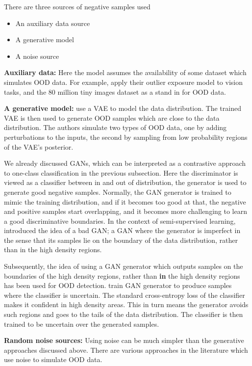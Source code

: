 \documentclass[../main.tex]{subfiles}
\begin{document}
There are three sources of negative samples used
\begin{itemize}
    \item An auxiliary data source
    \item A generative model
    \item A noise source
\end{itemize}{}

\textbf{Auxiliary data:} Here the model assumes the availability of some dataset which simulates OOD data. For example, \citet{hendrycks2018deep} apply their outlier exposure model to vision tasks, and the 80 million tiny images\citep{torralba200880} dataset as a stand in for OOD data.

\textbf{A generative model:} \cite{vernekar} use a VAE to model the data distribution. The trained VAE is then used to generate OOD samples which are close to the data distribution. The authors simulate two types of OOD data, one by adding perturbations to the inputs, the second by sampling from low probability regions of the VAE's posterior.

We already discussed GANs, which can be interpreted as a contrastive approach to one-class classification in the previous subsection. Here the discriminator is viewed as a classifier between in and out of distribution, the generator is used to generate good negative samples. Normally, the GAN generator is trained to mimic the training distribution, and if it becomes too good at that, the negative and positive samples start overlapping, and it becomes more challenging to learn a good discriminative boundaries. In the context of semi-supervised learning, \citep{dai2017good} introduced the idea of a bad GAN; a GAN where the generator is imperfect in the sense that its samples lie on the boundary of the data distribution, rather than in the high density regions.

Subsequently, the idea of using a GAN generator which outputs samples on the boundaries of the high density regions, rather than \textbf{in} the high density regions has been used for OOD detection. 
\cite{lee2017training} train GAN generator to produce samples where the classifier is uncertain. The standard cross-entropy loss of the classifier makes it confident in high density areas. This in turn means the generator avoids such regions and goes to the tails of the data distribution. The classifier is then trained to be uncertain over the generated samples. 

\textbf{Random noise sources:} Using noise can be much simpler than the generative approaches discussed above. There are various approaches in the literature which use noise to  simulate OOD data. 
\end{document}
